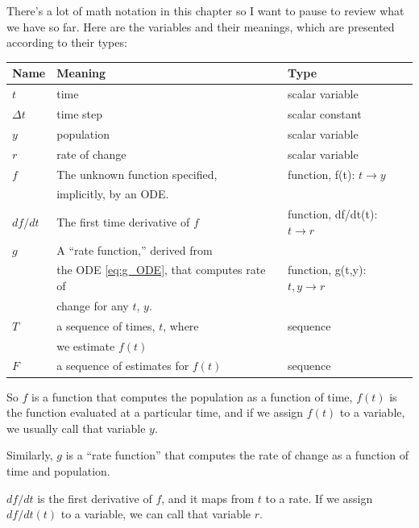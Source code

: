 \documentclass{book}
\begin{document}
There's a lot of math notation in this chapter so I want to pause to
review what we have so far.  Here are the variables and their meanings,
which are presented according to their types:

\begin{tabular}{|l|l|l|}
\hline
Name     &  Meaning             &  Type  \\
\hline \hline
$t$     &  time                 & scalar variable \\\hline
$\Delta t$  &  time step            & scalar constant \\\hline

$y$     &  population           & scalar variable \\\hline
$r$     &  rate of change       & scalar variable \\\hline

$f$     &  The unknown function specified,    &  function, f(t): $t \to y$  \\
        &  implicitly, by an ODE.             &    \\\hline

$df/dt$  &  The first time derivative of $f$  &  function, df/dt(t): $t \to r$  \\ \hline

$g$     &  A ``rate function,'' derived from     &  \\
        &  the ODE \eqref{eq:g_ODE}, that computes rate of &function, g(t,y): $t, y \to r$  \\
        &  change for any $t$, $y$.           &   \\\hline

$T$     & a sequence of times, $t$, where   & sequence \\
              & we estimate $f(t)$    &           \\\hline
$F$     & a sequence of estimates for $f(t)$  & sequence \\
\hline
\end{tabular}

So $f$ is a function that computes the population as a function of
time, $f(t)$ is the function evaluated at a particular time, and if we
assign $f(t)$ to a variable, we usually call that variable $y$.

Similarly, $g$ is a ``rate function'' that computes the rate of change as a
function of time and population.

$df/dt$ is the first derivative of $f$, and it maps from $t$ to a
rate.  If we assign $df/dt(t)$ to a variable,
we can call that variable $r$.
\end{document}
